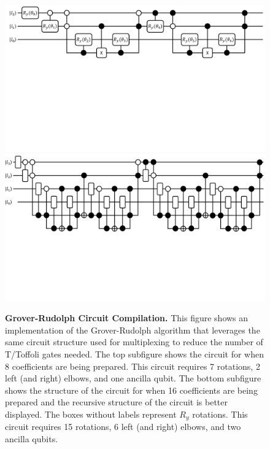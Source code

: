 \begin{figure}
    \centering
    \includegraphics[width=16cm]{figures/grover-rudolph.pdf}
    \includegraphics[width=16cm]{figures/grover-rudolph-4-qubits.pdf}
    \caption{
        \textbf{Grover-Rudolph Circuit Compilation.} 
        This figure shows an implementation of the Grover-Rudolph algorithm that leverages the same circuit structure used for multiplexing to reduce the number of T/Toffoli gates needed.
        The top subfigure shows the circuit for when 8 coefficients are being prepared.
        This circuit requires 7 rotations, 2 left (and right) elbows, and one ancilla qubit. 
        The bottom subfigure shows the structure of the circuit for when 16 coefficients are being prepared and the recursive structure of the circuit is better displayed.
        The boxes without labels represent $R_y$ rotations.
        This circuit requires 15 rotations, 6 left (and right) elbows, and two ancilla qubits.
    }
    \label{fig:grover-rudolph}
\end{figure}

